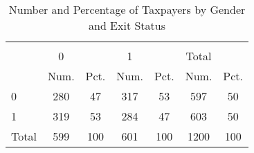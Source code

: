 \begin{table}[htbp]\centering
\def\sym#1{\ifmmode^{#1}\else\(^{#1}\)\fi}
\caption{Number and Percentage of Taxpayers by Gender and Exit Status}
\begin{tabular}{l*{3}{cc}}
\hline\hline
            &\multicolumn{6}{c}{}                                                         \\
            &           0&            &           1&            &       Total&            \\
            &        Num.&        Pct.&        Num.&        Pct.&        Num.&        Pct.\\
\hline
0           &         280&          47&         317&          53&         597&          50\\
1           &         319&          53&         284&          47&         603&          50\\
Total       &         599&         100&         601&         100&        1200&         100\\
\hline\hline
\end{tabular}
\end{table}
